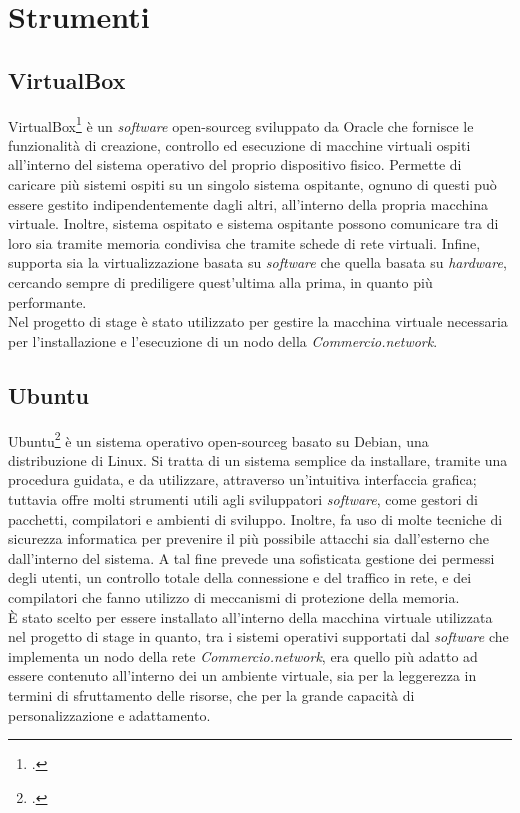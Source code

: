 \section{Strumenti}
\subsection{VirtualBox}

VirtualBox\footcite{site:virtual-box} è un \textit{software} \gls{open-sourceg} sviluppato da Oracle che fornisce le funzionalità di creazione, controllo ed esecuzione di macchine virtuali ospiti all'interno del sistema operativo del proprio dispositivo fisico. Permette di caricare più sistemi ospiti su un singolo sistema ospitante, ognuno di questi può essere gestito indipendentemente dagli altri, all'interno della propria macchina virtuale. Inoltre, sistema ospitato e sistema ospitante possono comunicare tra di loro sia tramite memoria condivisa che tramite schede di rete virtuali. Infine, supporta sia la virtualizzazione basata su \textit{software} che quella basata su \textit{hardware}, cercando sempre di prediligere quest'ultima alla prima, in quanto più performante.\\
Nel progetto di stage è stato utilizzato per gestire la macchina virtuale necessaria per l'installazione e l'esecuzione di un nodo della \textit{Commercio.network}.

\subsection{Ubuntu}

Ubuntu\footcite{site:ubuntu} è un sistema operativo \gls{open-sourceg} basato su Debian, una distribuzione di Linux. Si tratta di un sistema semplice da installare, tramite una procedura guidata, e da utilizzare, attraverso un'intuitiva interfaccia grafica; tuttavia offre molti strumenti utili agli sviluppatori \textit{software}, come gestori di pacchetti, compilatori e ambienti di sviluppo. Inoltre, fa uso di molte tecniche di sicurezza informatica per prevenire il più possibile attacchi sia dall'esterno che dall'interno del sistema. A tal fine prevede una sofisticata gestione dei permessi degli utenti, un controllo totale della connessione e del traffico in rete, e dei compilatori che fanno utilizzo di meccanismi di protezione della memoria. \\
È stato scelto per essere installato all'interno della macchina virtuale utilizzata nel progetto di stage in quanto, tra i sistemi operativi supportati dal \textit{software} che implementa un nodo della rete \textit{Commercio.network}, era quello più adatto ad essere contenuto all'interno dei un ambiente virtuale, sia per la leggerezza in termini di sfruttamento delle risorse, che per la grande capacità di personalizzazione e adattamento.

